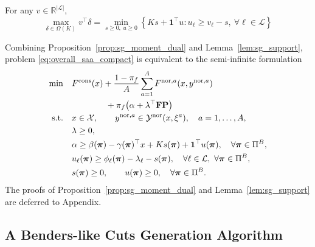 \begin{lemma}
\label{lem:sg_support}
For any $v\in\mathbb{R}^{|\mathcal{L}|}$,
\begin{equation*}
\max_{\delta\in\Omega(K)} v^\top\delta
=
\min_{s\ge 0,\ u\ge 0}
\left\{Ks+\mathbf{1}^\top u: u_{\ell}\ge v_{\ell}-s,\ \forall \ell\in\mathcal{L}\right\}
\end{equation*}
\end{lemma}

Combining Proposition~\ref{prop:sg_moment_dual} and Lemma~\ref{lem:sg_support}, problem \eqref{eq:overall_saa_compact} is equivalent to the semi-infinite formulation
\begin{equation}
\label{eq:sg_semiinf}
\begin{aligned}
\min\quad
&F^{\mathrm{cons}}(x)
+\frac{1-\pi_f}{A}\sum_{a=1}^A F^{{\rm nor},a}(x,y^{{\rm nor},a}) \\
&\qquad \qquad +\pi_f\big(\alpha+\lambda^\top \mathbf{FP}\big)\\
\text{s.t.}\quad
&x\in \mathcal{X},\qquad y^{{\rm nor},a}\in \mathcal{Y}^{\mathrm{nor}}(x,\xi^a),\quad a=1,\dots,A,\\
&\lambda\ge 0,\\
&\alpha\ge \beta(\boldsymbol{\pi})-\gamma(\boldsymbol{\pi})^\top x+Ks(\boldsymbol{\pi})+\mathbf{1}^\top u(\boldsymbol{\pi}),\quad \forall\boldsymbol{\pi}\in\Pi^B,\\
&u_{\ell}(\boldsymbol{\pi})\ge \phi_{\ell}(\boldsymbol{\pi})-\lambda_{\ell}-s(\boldsymbol{\pi}),\quad \forall \ell\in\mathcal{L},\ \forall\boldsymbol{\pi}\in\Pi^B,\\
&s(\boldsymbol{\pi})\ge 0,\qquad u(\boldsymbol{\pi})\ge 0,\quad \forall\boldsymbol{\pi}\in\Pi^B.
\end{aligned}
\end{equation}
The proofs of Proposition~\ref{prop:sg_moment_dual} and Lemma~\ref{lem:sg_support} are deferred to Appendix.

\subsection{A Benders-like Cuts Generation Algorithm}
\label{subsec:sg_ccg}

